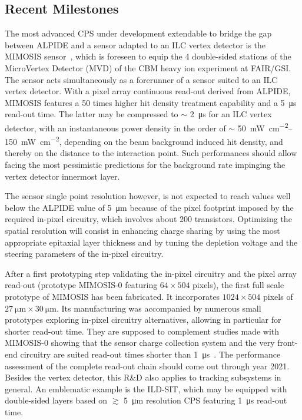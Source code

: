 \subsection{Recent Milestones}
The most advanced CPS under development extendable to bridge the 
gap between ALPIDE and a sensor adapted to an ILC vertex detector 
is the MIMOSIS sensor~\cite{Morel:mimosis}, which is foreseen to 
equip the 4 double-sided stations of the MicroVertex Detector (MVD) 
of the CBM heavy ion experiment at FAIR/GSI. The sensor acts 
simultaneously as a forerunner of a sensor suited to an ILC vertex 
detector. With a pixel array continuous read-out derived from ALPIDE, 
MIMOSIS features a 50 times higher hit density treatment capability 
and a \SI{5}{\micro\second} read-out time. The latter may be compressed to 
$\sim$ \SI{2}{\micro\second} for an ILC vertex detector, with an instantaneous 
power density in the order of $\sim$ \SIrange{50}{150}{\milli\watt\per\centi\meter\squared}, depending 
on the beam background induced hit density, and thereby on the 
distance to the interaction point. Such performances should allow 
facing the most pessimistic predictions for the background rate 
impinging the vertex detector innermost layer. 

The sensor single point resolution however, is not expected to reach
values well below the ALPIDE value of \SI{5}{\micro\meter} because of the pixel 
footprint imposed by the required in-pixel circuitry, which involves 
about 200 transistors. Optimizing the spatial resolution will consist 
in enhancing charge sharing by using the most appropriate epitaxial 
layer thickness and by tuning the depletion voltage and the steering 
parameters of the in-pixel circuitry. 

After a first prototyping step validating the in-pixel circuitry and the 
pixel array read-out (prototype MIMOSIS-0 featuring $64 \times 504$ pixels), 
the first full scale prototype of MIMOSIS has been fabricated. It 
incorporates $1024 \times 504$ pixels of $\SI{27}{\micro\meter} \times \SI{30}{\micro\meter}$. Its manufacturing 
was accompanied by numerous small prototypes exploring in-pixel circuitry alternatives, allowing in particular for shorter read-out time. They 
are supposed to complement studies made with MIMOSIS-0 showing that the 
sensor charge collection system and the very front-end circuitry are 
suited read-out times shorter than \SI{1}{\micro\second}~\cite{DEVEAUX2020162653}. 
The performance assessment of the complete read-out chain should come 
out through year 2021. Besides the vertex detector, this R\&D also 
applies to tracking subsystems in general. An emblematic example is 
the ILD-SIT, which may be equipped with double-sided layers based on 
$\gtrsim$ \SI{5}{\micro\meter} resolution CPS featuring \SI{1}{\micro\second} read-out time.

